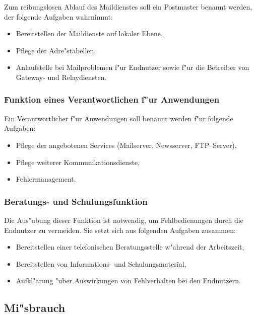Zum reibungslosen Ablauf des Maildienstes soll ein Postmaster benannt
werden, der folgende Aufgaben wahrnimmt:

\begin{itemize}
  \item Bereitstellen der Maildienste auf lokaler Ebene,
  \item Pflege der Adre"stabellen,
  \item Anlaufstelle bei Mailproblemen f"ur Endnutzer sowie f"ur die Betreiber
    von Gateway- und Relaydiensten.
\end{itemize}

\subsubsection{Funktion eines Verantwortlichen f"ur Anwendungen}

Ein Verantwortlicher f"ur Anwendungen soll benannt werden f"ur folgende
Aufgaben:

\begin{itemize}
  \item Pflege der angebotenen Services (Mailserver, Newsserver, FTP--Server),
  \item Pflege weiterer Kommunikationsdienste,
  \item Fehlermanagement.
\end{itemize}

\subsubsection{Beratungs- und Schulungsfunktion}

Die Aus"ubung dieser Funktion ist notwendig, um Fehlbedienungen durch die
Endnutzer zu vermeiden. Sie setzt sich aus folgenden Aufgaben zusammen:

\begin{itemize}
  \item Bereitstellen einer telefonischen Beratungsstelle w"ahrend der
    Arbeitszeit,
  \item Bereitstellen von Informations- und Schulungsmaterial,
  \item Aufkl"arung "uber Auswirkungen von Fehlverhalten bei den Endnutzern.
\end{itemize}

\subsection{Mi"sbrauch}

